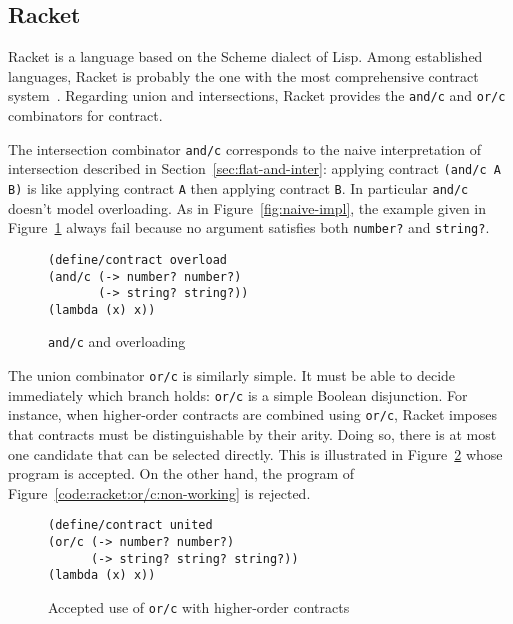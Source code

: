 \documentclass[sigplan,10pt,review,anonymous]{acmart}
\newcommand{\racket}[1]{\lstinline[language=racket]{#1}}
\begin{document}
\subsection{Racket}
\label{sec:racket}

Racket is a language based on the Scheme dialect of Lisp. Among established
languages, Racket is probably the one with the most comprehensive contract
system~\cite{RacketContracts}. Regarding union and intersections, Racket provides
the \racket{and/c} and \racket{or/c} combinators for contract.

The
intersection combinator \racket{and/c} corresponds to the naive
interpretation of intersection described in
Section~\ref{sec:flat-and-inter}: applying contract \racket{(and/c A
  B)} is like applying contract \racket{A} then applying contract \racket{B}. In
particular \racket{and/c} doesn't model overloading. As in
Figure~\ref{fig:naive-impl}, the example given in
Figure~\ref{fig:racket-overloading} always fail because no argument satisfies
both \racket{number?} and \racket{string?}.

\begin{figure}[h]
\begin{lstlisting}[language=racket]
(define/contract overload
(and/c (-> number? number?)
       (-> string? string?))
(lambda (x) x))
\end{lstlisting}
\caption{\racket{and/c} and overloading}
\label{fig:racket-overloading}
\end{figure}

The union combinator \racket{or/c} is similarly simple. It must be
able to decide immediately which branch holds: \racket{or/c} is a
simple Boolean disjunction. For instance, when higher-order contracts are combined using \racket{or/c}, Racket imposes
that contracts must be distinguishable by their arity. Doing so, there is at most
one candidate that can be selected directly. This is illustrated in
Figure~\ref{code:racket:or/c:working} whose program is accepted. On the other
hand, the program of Figure~\ref{code:racket:or/c:non-working} is rejected.

\begin{figure}[h]

\begin{lstlisting}[language=racket]
(define/contract united
(or/c (-> number? number?)
      (-> string? string? string?))
(lambda (x) x))
\end{lstlisting}
\caption{Accepted use of \racket{or/c} with higher-order contracts}
\label{code:racket:or/c:working}

\end{figure}
\end{document}

